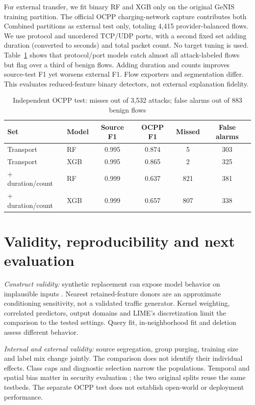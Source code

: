\documentclass[conference,letterpaper]{IEEEtran}
\begin{document}
For external transfer, we fit binary RF and XGB only on the original GeNIS training partition. The official OCPP charging-network capture \cite{ocpp} contributes both Combined partitions as external test only, totaling 4,415 provider-balanced flows. We use protocol and unordered TCP/UDP ports, with a second fixed set adding duration (converted to seconds) and total packet count. No target tuning is used. Table~\ref{tab:external} shows that protocol/port models catch almost all attack-labeled flows but flag over a third of benign flows. Adding duration and counts improves source-test F1 yet worsens external F1. Flow exporters and segmentation differ. This evaluates reduced-feature binary detectors, not external explanation fidelity.
\begin{table}[t]\centering
\caption{Independent OCPP test: misses out of 3,532 attacks; false alarms out of 883 benign flows}
\label{tab:external}
\footnotesize
\setlength{\tabcolsep}{3pt}\renewcommand{\arraystretch}{1.12}
\begin{tabular}{llcccc}\toprule
Set & Model & Source F1 & OCPP F1 & Missed & False alarms \\\midrule
Transport & RF & 0.995 & 0.874 & 5 & 303 \\
Transport & XGB & 0.995 & 0.865 & 2 & 325 \\
+ duration/count & RF & 0.999 & 0.637 & 821 & 381 \\
+ duration/count & XGB & 0.999 & 0.657 & 807 & 338 \\
\bottomrule\end{tabular}
\end{table}
\section{Validity, reproducibility and next evaluation}
\textit{Construct validity:} synthetic replacement can expose model behavior on implausible inputs \cite{slack}. Nearest retained-feature donors are an approximate conditioning sensitivity, not a validated traffic generator. Kernel weighting, correlated predictors, output domains and LIME's discretization limit the comparison to the tested settings. Query fit, in-neighborhood fit and deletion assess different behavior.

\textit{Internal and external validity:} source segregation, group purging, training size and label mix change jointly. The comparison does not identify their individual effects. Class caps and diagnostic selection narrow the populations. Temporal and spatial bias matter in security evaluation \cite{tesseract}; the two original splits reuse the same testbeds. The separate OCPP test does not establish open-world or deployment performance.
\end{document}
